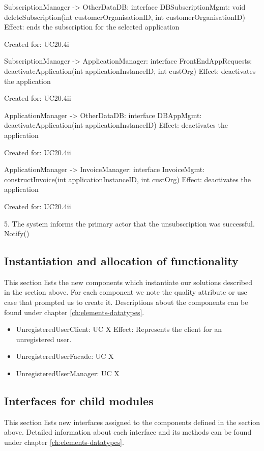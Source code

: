 {{{{{{{{{{{{{{            SubscriptionManager -> OtherDataDB: interface DBSubscriptionMgmt: void deleteSubscription(int customerOrganisationID, int customerOrganisationID)
                Effect: ends the subscription for the selected application
                \item Created for: UC20.4i

            SubscriptionManager -> ApplicationManager: interface FrontEndAppRequests: deactivateApplication(int applicationInstanceID, int custOrg)
                Effect: deactivates the application
                \item Created for: UC20.4ii

            ApplicationManager -> OtherDataDB: interface DBAppMgmt: deactivateApplication(int applicationInstanceID)
                Effect: deactivates the application
                \item Created for: UC20.4ii

            ApplicationManager -> InvoiceManager: interface InvoiceMgmt: constructInvoice(int applicationInstanceID, int custOrg)
                Effect: deactivates the application
                \item Created for: UC20.4ii

        5. The system informs the primary actor that the unsubscription was successful.
            Notify()


\subsection{Instantiation and allocation of functionality}
    This section lists the new components which instantiate our solutions
    described in the section above. For each component we note the quality
    attribute or use case that prompted us to create it. Descriptions about
    the components can be found under chapter \ref{ch:elements-datatypes}. \\

    \begin{itemize}
        \item UnregisteredUserClient: UC X
              Effect: Represents the client for an unregistered user.
        \item UnregisteredUserFacade: UC X
        \item UnregisteredUserManager: UC X
    \end{itemize}


\subsection{Interfaces for child modules}
    This section lists new interfaces assigned to the components defined
    in the section above. Detailed information about each interface and
    its methods can be found under chapter \ref{ch:elements-datatypes}. \\

}}}}}}}}}}}}}}
